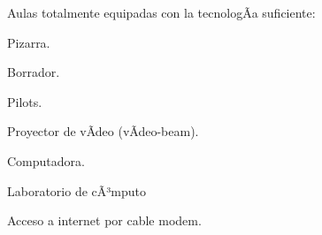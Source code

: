 \begin{syllabus}
\begin{didactical-resources}
Aulas totalmente equipadas con la tecnologÃ­a suficiente:

\begin{inparaenum}[ \bf I:]
\item Pizarra.
\item Borrador.
\item Pilots.
\item Proyector de vÃ­deo (vÃ­deo-beam).
\item Computadora.
\item Laboratorio de cÃ³mputo
\item Acceso a internet por cable modem.
\end{inparaenum}

\end{didactical-resources}


\begin{coursebibliography}
\end{coursebibliography}

\end{syllabus}
